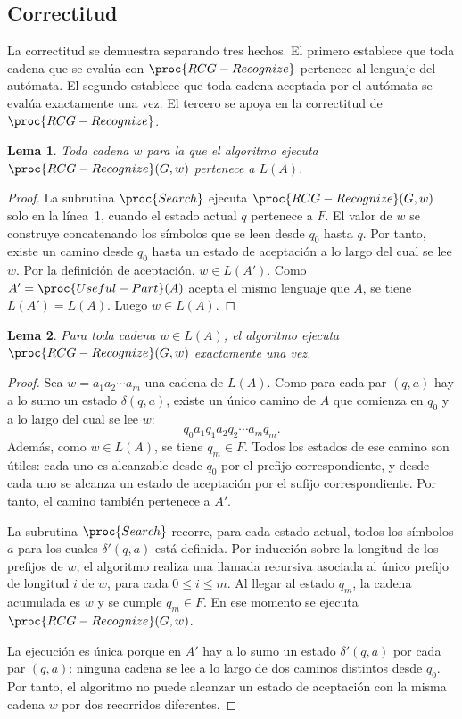 \documentclass{report}
\theoremstyle{definition}
\theoremstyle{plain}
\newtheorem{lema}{Lema}[chapter]
\theoremstyle{remark}
\begin{document}
\subsection{Correctitud}
\label{sec:correctitud-algoritmo}

La correctitud se demuestra separando tres hechos. El primero establece
que toda cadena que se evalúa con $\proc{RCG-Recognize}$ pertenece al
lenguaje del autómata. El segundo establece que toda cadena aceptada por
el autómata se evalúa exactamente una vez. El tercero se apoya en la
correctitud de $\proc{RCG-Recognize}$.

\begin{lema}
\label{lema:sonido-automata}
Toda cadena $w$ para la que el algoritmo ejecuta
$\proc{RCG-Recognize}(G,w)$ pertenece a $L(A)$.
\end{lema}

\begin{proof}
La subrutina $\proc{Search}$ ejecuta $\proc{RCG-Recognize}(G,w)$ solo en
la línea~1, cuando el estado actual $q$ pertenece a $F$. El valor de $w$
se construye concatenando los símbolos que se leen desde $q_0$ hasta
$q$. Por tanto, existe un camino desde $q_0$ hasta un estado de
aceptación a lo
largo del cual se lee $w$. Por la definición de aceptación,
$w \in L(A')$. Como $A'=\proc{Useful-Part}(A)$ acepta el mismo lenguaje
que $A$, se tiene $L(A')=L(A)$. Luego $w \in L(A)$.
\end{proof}

\begin{lema}
\label{lema:completo-automata}
Para toda cadena $w \in L(A)$, el algoritmo ejecuta
$\proc{RCG-Recognize}(G,w)$ exactamente una vez.
\end{lema}

\begin{proof}
Sea $w=a_1a_2\cdots a_m$ una cadena de $L(A)$. Como para cada par
$(q,a)$ hay a lo sumo un estado $\delta(q,a)$, existe un único camino de
$A$ que comienza en $q_0$ y a lo largo del cual se lee $w$:
\[
  q_0 a_1 q_1 a_2 q_2 \cdots a_m q_m.
\]
Además, como $w \in L(A)$, se tiene $q_m \in F$. Todos los estados de ese
camino son útiles: cada uno es alcanzable desde $q_0$ por el prefijo
correspondiente, y desde cada uno se alcanza un estado de aceptación
por el
sufijo correspondiente. Por tanto, el camino también pertenece a $A'$.

La subrutina $\proc{Search}$ recorre, para cada estado actual, todos los
símbolos $a$ para los cuales $\delta'(q,a)$ está definida. Por inducción
sobre la longitud de los prefijos de $w$, el algoritmo realiza una
llamada recursiva asociada al único prefijo de longitud $i$ de $w$, para
cada $0 \le i \le m$. Al llegar al estado $q_m$, la cadena acumulada es
$w$ y se cumple $q_m \in F$. En ese momento se ejecuta
$\proc{RCG-Recognize}(G,w)$.

La ejecución es única porque en $A'$ hay a lo sumo un estado
$\delta'(q,a)$ por cada par $(q,a)$: ninguna cadena se lee a lo largo
de dos caminos distintos desde $q_0$.
Por tanto, el algoritmo no puede alcanzar un estado de aceptación con
la misma
cadena $w$ por dos recorridos diferentes.
\end{proof}
\end{document}
